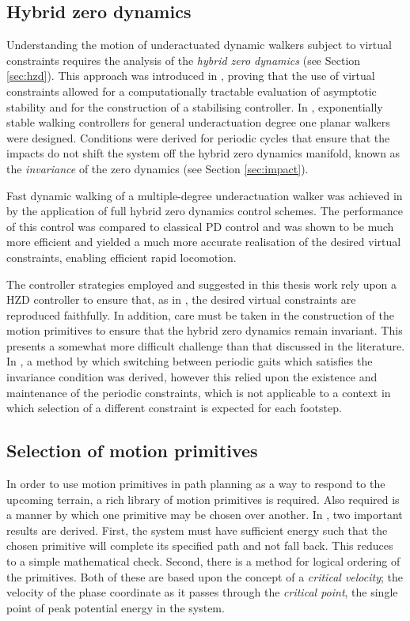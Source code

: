\subsection{Hybrid zero dynamics}
Understanding the motion of underactuated dynamic walkers subject to virtual constraints requires the analysis of the \textit{hybrid zero dynamics} (see Section \ref{sec:hzd}). This approach was introduced in \cite{grizzle2001asymptotically}, proving that the use of virtual constraints allowed for a computationally tractable evaluation of asymptotic stability and for the construction of a stabilising controller. In \cite{westervelt2003hybrid}, exponentially stable walking controllers for general underactuation degree one planar walkers were designed. Conditions were derived for periodic cycles that ensure that the impacts do not shift the system off the hybrid zero dynamics manifold, known as the \textit{invariance} of the zero dynamics (see Section \ref{sec:impact}). 

Fast dynamic walking of a multiple-degree underactuation walker was achieved in \cite{sreenath2011compliant} by the application of full hybrid zero dynamics control schemes. The performance of this control was compared to classical PD control and was shown to be much more efficient and yielded a much more accurate realisation of the desired virtual constraints, enabling efficient rapid locomotion. 

The controller strategies employed and suggested in this thesis work rely upon a HZD controller to ensure that, as in \cite{sreenath2011compliant}, the desired virtual constraints are reproduced faithfully. In addition, care must be taken in the construction of the motion primitives to ensure that the hybrid zero dynamics remain invariant. This presents a somewhat more difficult challenge than that discussed in the literature. In \cite{westervelt2007feedback}, a method by which switching between periodic gaits which satisfies the invariance condition was derived, however this relied upon the existence and maintenance of the periodic constraints, which is not applicable to a context in which selection of a different constraint is expected for each footstep.

\subsection{Selection of motion primitives}\label{sec:selection}
In order to use motion primitives in path planning as a way to respond to the upcoming terrain, a rich library of motion primitives is required. Also required is a manner by which one primitive may be chosen over another. In \cite{manchester13planning}, two important results are derived. First, the system must have sufficient energy such that the chosen primitive will complete its specified path and not fall back. This reduces to a simple mathematical check. Second, there is a method for logical ordering of the primitives. Both of these are based upon the concept of a \textit{critical velocity}; the velocity of the phase coordinate as it passes through the \textit{critical point}, the single point of peak potential energy in the system. 

